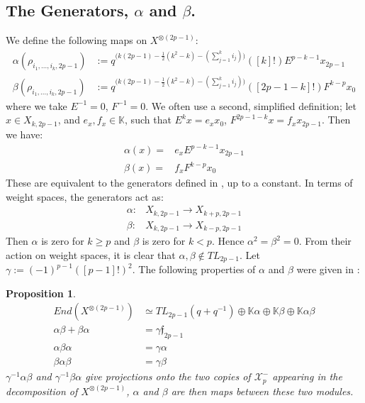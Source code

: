 \documentclass[]{article}
\newtheorem{prop}{Proposition}[section]
\begin{document}
\subsection{The Generators, $\alpha$ and $\beta$.\label{gen}}
We define the following maps on $X^{\otimes(2p-1)}$:
\begin{align*}
\alpha(\rho_{i_{1},...,i_{k},2p-1})&:=q^{\big(k(2p-1)-\frac{1}{2}(k^{2}-k)-(\sum\limits_{j=1}^{k}i_{j})\big)}([k]!)E^{p-k-1}x_{2p-1}\\
\beta(\rho_{i_{1},...,i_{k},2p-1})&:=q^{\big(k(2p-1)-\frac{1}{2}(k^{2}-k)-(\sum\limits_{j=1}^{k}i_{j})\big)}([2p-1-k]!)F^{k-p}x_{0}
\end{align*}
where we take $E^{-1}=0$, $F^{-1}=0$. We often use a second, simplified definition; let $x\in X_{k,2p-1}$, and $e_{x},f_{x}\in\mathbb{K}$, such that $E^{k}x=e_{x}x_{0}$, $F^{2p-1-k}x=f_{x}x_{2p-1}$. Then we have:
\begin{align*}
\alpha(x)=& e_{x}E^{p-k-1}x_{2p-1}\\
\beta(x)=& f_{x}F^{k-p}x_{0}
\end{align*}
These are equivalent to the generators defined in \cite{GST}, up to a constant. In terms of weight spaces, the generators act as:
\begin{align*}
\alpha:& X_{k,2p-1}\rightarrow X_{k+p,2p-1}\\
\beta:& X_{k,2p-1}\rightarrow X_{k-p,2p-1} 
\end{align*} Then $\alpha$ is zero for $k\geq p$ and $\beta$ is zero for $k< p$. Hence $\alpha^{2}=\beta^{2}=0$. From their action on weight spaces, it is clear that $\alpha,\beta\notin TL_{2p-1}$. Let $\gamma:=(-1)^{p-1}([p-1]!)^2$. The following properties of $\alpha$ and $\beta$ were given in \cite{GST}:
\begin{prop}
\begin{align*}
End(X^{\otimes(2p-1)})&\simeq TL_{2p-1}(q+q^{-1})\oplus\mathbb{K}\alpha\oplus\mathbb{K}\beta\oplus\mathbb{K}\alpha\beta\\
\alpha\beta+\beta\alpha&=\gamma \mathfrak{f}_{2p-1}\\
\alpha\beta\alpha&=\gamma\alpha\\
\beta\alpha\beta&=\gamma\beta
\end{align*}
$\gamma^{-1}\alpha\beta$ and $\gamma^{-1}\beta\alpha$ give projections onto the two copies of $\mathcal{X}^{-}_{p}$ appearing in the decomposition of $X^{\otimes(2p-1)}$, $\alpha$ and $\beta$ are then maps between these two modules. \label{prop 3}
\end{prop}
\end{document}
